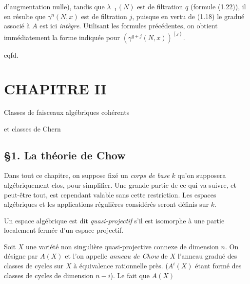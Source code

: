 d'augmentation nulle), tandis que $\lambda_{-1}(N)$ est de filtration $q$ (formule (1.22)), il en résulte que $\gamma^n(N,x)$ est de filtration $j$, puisque en vertu de (1.18) le gradué associé à $A$ est ici \emph{intègre}. Utilisant les formules précédentes, on obtient immédiatement la forme indiquée pour $(\gamma^{q+j}(N,x))^{(j)}$.
\begin{flushright}cqfd.\end{flushright}

\section*{CHAPITRE II}
\begin{center}
Classes de faisceaux algébriques cohérents\par
et classes de Chern
\end{center}

\subsection*{\S 1. La théorie de Chow}

Dans tout ce chapitre, on suppose fixé un \emph{corps de base} $k$ qu'on supposera algébriquement clos, pour simplifier. Une grande partie de ce qui va suivre, et peut-être tout, est cependant valable sans cette restriction. Les espaces algébriques et les applications régulières considérés seront définis sur $k$.

Un espace algébrique est dit \emph{quasi-projectif} s'il est isomorphe à une partie localement fermée d'un espace projectif.

Soit $X$ une variété non singulière quasi-projective connexe de dimension $n$. On désigne par $A(X)$ et l'on appelle \emph{anneau de Chow} de $X$ l'anneau gradué des classes de cycles sur $X$ à équivalence rationnelle près. ($A^i(X)$ étant formé des classes de cycles de dimension $n-i$). Le fait que $A(X)$
